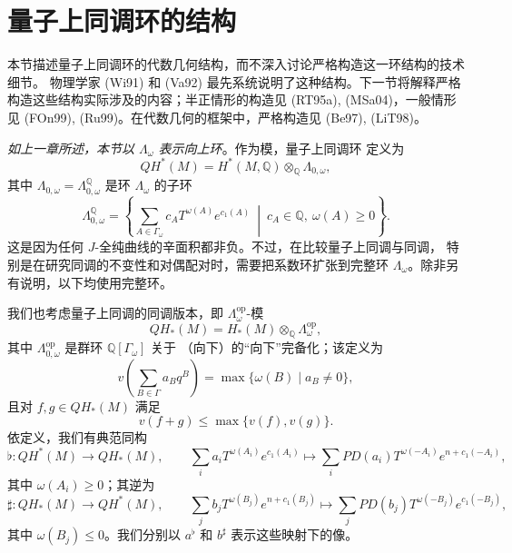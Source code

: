 \section{量子上同调环的结构}
\label{sec:quantum-cohomology-ring-structure}

本节描述量子上同调环的代数几何结构，而不深入讨论严格构造这一环结构的技术细节。
物理学家\personWitten{} (Wi91) 和\personCumrunVafa{} (Va92) 最先系统说明了这种结构。下一节将解释严格
构造这些结构实际涉及的内容；半正情形的构造见 (RT95a), (MSa04)，一般情形见
(FOn99), (Ru99)。在代数几何的框架中，严格构造见 (Be97), (LiT98)。

\emph{如上一章所述，本节以 $\Lambda_\omega$ 表示向上\personNovikov{}环}。作为模，量子上同调环
定义为
\[
 QH^*(M)=H^*(M,\mathbb Q)\otimes_{\mathbb Q}\Lambda_{0,\omega},
\]
其中 $\Lambda_{0,\omega}=\Lambda^{\mathbb Q}_{0,\omega}$ 是\personNovikov{}环
$\Lambda_\omega$ 的子环
\[
 \Lambda^{\mathbb Q}_{0,\omega}=
 \left\{\sum_{A\in\Gamma_\omega}c_A T^{\omega(A)}e^{c_1(A)}
 \ \middle|\ c_A\in\mathbb Q,\ \omega(A)\geq0\right\}.
\]
这是因为任何 $J$-全纯曲线的辛面积都非负。不过，在比较量子上同调与\personFloer{}同调，
特别是在研究\personFloer{}同调的不变性和对偶配对时，需要把系数环扩张到完整\personNovikov{}环
$\Lambda_\omega$。除非另有说明，以下均使用完整\personNovikov{}环。

我们也考虑量子上同调的同调版本，即 $\Lambda_\omega^{\mathrm{op}}$-模
\[
 QH_*(M)=H_*(M)\otimes_{\mathbb Q}\Lambda_\omega^{\mathrm{op}},
\]
其中 $\Lambda_{0,\omega}^{\mathrm{op}}$ 是群环 $\mathbb Q[\Gamma_\omega]$ 关于
（向下）\termValuation{}的“向下”完备化；该\termValuation{}定义为
\begin{equation}
 v\!\left(\sum_{B\in\Gamma}a_Bq^B\right)
 =\max\{\omega(B)\mid a_B\neq0\},
 \label{eq:20-downward-valuation}
\end{equation}
且对 $f,g\in QH_*(M)$ 满足
\[
 v(f+g)\leq\max\{v(f),v(g)\}.
\]
依定义，我们有典范同构
\begin{equation}
 \flat:QH^*(M)\longrightarrow QH_*(M),\qquad
 \sum_i a_iT^{\omega(A_i)}e^{c_1(A_i)}\longmapsto
 \sum_iPD(a_i)T^{\omega(-A_i)}e^{n+c_1(-A_i)},
 \label{eq:20-flat-qh}
\end{equation}
其中 $\omega(A_i)\geq0$；其逆为
\begin{equation}
 \sharp:QH_*(M)\longrightarrow QH^*(M),\qquad
 \sum_j b_jT^{\omega(B_j)}e^{n+c_1(B_j)}\longmapsto
 \sum_jPD(b_j)T^{\omega(-B_j)}e^{c_1(-B_j)},
 \label{eq:20-sharp-qh}
\end{equation}
其中 $\omega(B_j)\leq0$。我们分别以 $a^\flat$ 和 $b^\sharp$ 表示这些映射下的像。

